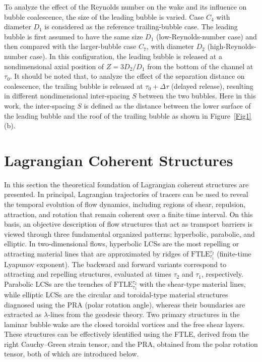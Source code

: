 \documentclass[aps,prfluids,reprint,nofootinbib,onecolumn,groupedaddress,showkeys]{revtex4-2}
\begin{document}
	To analyze the effect of the Reynolds number on the wake and its influence on bubble coalescence, the size of the leading bubble is varied. Case $C_4$ with diameter $D_1$ is considered as the reference trailing-bubble case. The leading bubble is first assumed to have the same size $D_1$ (low-Reynolds-number case) and then compared with the larger-bubble case $C_7$, with diameter $D_2$ (high-Reynolds-number case). In this configuration, the leading bubble is released at a nondimensional axial position of $Z = 3D_2 / D_1$ from the bottom of the channel at $\tau_0$. It should be noted that, to analyze the effect of the separation distance on coalescence, the trailing bubble is released at $\tau_0 + \Delta \tau$ (delayed release), resulting in different nondimensional inter-spacing $S$ between the two bubbles. Here in this work, the inter-spacing $S$ is defined as the distance between the lower surface of the leading bubble and the roof of the trailing bubble as shown in Figure~\ref{Fig1}(b).
	
	\section{Lagrangian Coherent Structures}
	\label{Lagrangian Coherent Structures}
	In this section the theoretical foundation of Lagrangian coherent structures are presented. In principal, Lagrangian trajectories of tracers can be used to reveal the temporal evolution of flow dynamics, including regions of shear, repulsion, attraction, and rotation that remain coherent over a finite time interval. On this basis, an objective description of flow structures that act as transport barriers is viewed through three fundamental organized patterns: hyperbolic, parabolic, and elliptic. In two-dimensional flows, hyperbolic LCSs are the most repelling or attracting material lines that are approximated by ridges of $\mathrm{FTLE}_{\tau_1}^{\tau_2}$ (finite-time Lyapunov exponent). The backward and forward variants correspond to attracting and repelling structures, evaluated at times $\tau_2$ and $\tau_1$, respectively. Parabolic LCSs are the trenches of $\mathrm{FTLE}_{\tau_1}^{\tau_2}$ with the shear-type material lines, while elliptic LCSs are the circular and toroidal-type material structures {\color{black}diagnosed} using the {\color{black}PRA} (polar rotation angle), {\color{black}whereas} their {\color{black}boundaries} are extracted as $\lambda$-lines from the {\color{black}geodesic} theory. 
	Two primary structures in the laminar bubble wake are the closed toroidal vortices and the free shear layers. These structures can be effectively identified using the FTLE, derived from the right Cauchy–Green strain tensor, and the PRA, obtained from the polar rotation tensor, both of which are introduced below.
	
\end{document}
